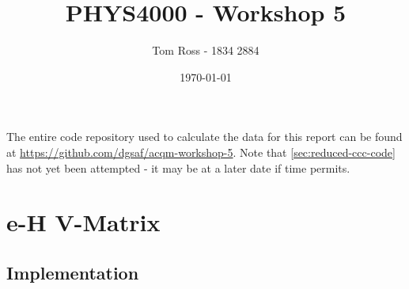 \documentclass{article}
\title{PHYS4000 - Workshop 5}
\author{Tom Ross - 1834 2884}
\date{\today}
\begin{document}
\tableofcontents

\listoffigures

\listoftables

\clearpage

The entire code repository used to calculate the data for this report can be
found at \url{https://github.com/dgsaf/acqm-workshop-5}.
Note that \autoref{sec:reduced-ccc-code} has not yet been attempted - it may be
at a later date if time permits.

\section{e-H V-Matrix}
\label{sec:e-h-v-matrix}

\subsection{Implementation}
\label{sec:implementation}
\end{document}
